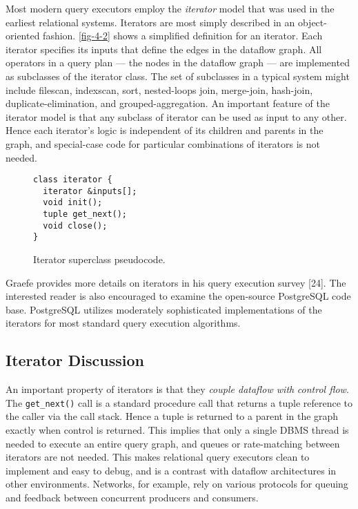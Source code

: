 \documentclass[a4paper,11pt,twoside,openright]{book}
\begin{document}
Most modern query executors employ the \emph{iterator} model that was
used in the earliest relational systems. Iterators are most simply
described in an object-oriented fashion. \autoref{fig-4-2} shows a simplified
definition for an iterator. Each iterator specifies its inputs that
define
the edges in the dataflow graph. All operators in a query plan --- the
nodes in the dataflow graph --- are implemented as subclasses of the
iterator class. The set of subclasses in a typical system might include
filescan, indexscan, sort, nested-loops join, merge-join, hash-join,
duplicate-elimination, and grouped-aggregation. An important feature of
the iterator model is that any subclass of iterator can be used as input
to any other. Hence each iterator's logic is independent of its children
and parents in the graph, and special-case code for particular
combinations of iterators is not needed.

\begin{figure}
\centering
\begin{BVerbatim}
class iterator {
  iterator &inputs[];
  void init();
  tuple get_next();
  void close();
}
\end{BVerbatim}

\caption{Iterator superclass pseudocode.\label{fig-4-2}}
\end{figure}

Graefe provides more details on iterators in his query execution survey
{[}24{]}. The interested reader is also encouraged to examine the
open-source PostgreSQL code base. PostgreSQL utilizes moderately
sophisticated implementations of the iterators for most standard query
execution algorithms.

\hypertarget{iterator-discussion}{%
\subsection{Iterator Discussion}\label{iterator-discussion}}

An important property of iterators is that they \emph{couple dataflow
with} \emph{control flow}. The \texttt{get\_next()} call is a standard procedure
call that returns a tuple reference to the caller via the call stack.
Hence a tuple is returned to a parent in the graph exactly when control
is returned. This implies that only a single DBMS thread is needed to
execute an entire query graph, and queues or rate-matching between
iterators are not needed. This makes relational query executors clean to
implement and easy to debug, and is a contrast with dataflow
architectures in other environments. Networks, for example, rely on
various protocols for queuing and feedback between concurrent producers
and consumers.
\end{document}

